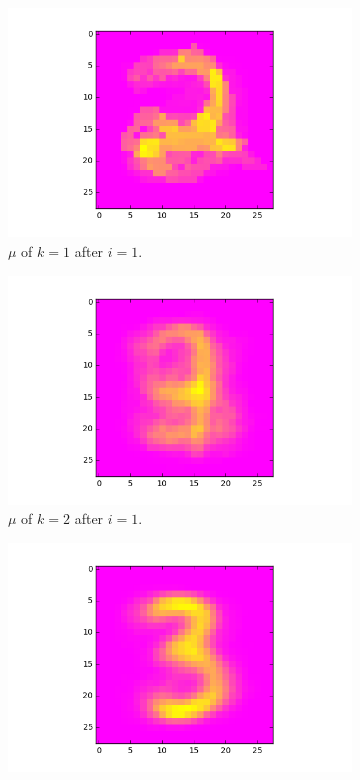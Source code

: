\documentclass[a4paper,10pt]{article}
\numberwithin{equation}{section} %
\numberwithin{figure}{section} %
\numberwithin{table}{section} %
\theoremstyle{mytheor}
\begin{document}
\begin{enumerate}
\begin{figure}[h!]
\begin{subfigure}[b]{0.26\textwidth}
				\includegraphics[width=\textwidth]{digits/0_k3_class1.png}\vspace{-0.4cm}
				\caption{$\mu$ of $k=1$ after $i=1$.}
			\end{subfigure}
			\begin{subfigure}[b]{0.26\textwidth}
				\includegraphics[width=\textwidth]{digits/0_k3_class2.png}\vspace{-0.4cm}
				\caption{$\mu$ of $k=2$ after $i=1$.}
			\end{subfigure}
			\begin{subfigure}[b]{0.26\textwidth}
				\includegraphics[width=\textwidth]{digits/14_k3_class0.png}\vspace{-0.4cm}

\end{subfigure}
\end{figure}
\end{enumerate}
\end{document}
